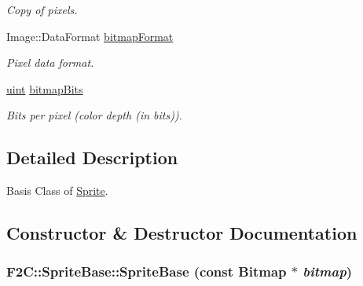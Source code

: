 \begin{DoxyCompactItemize}
\begin{DoxyCompactList}\small\item\em Copy of pixels. \item\end{DoxyCompactList}\item 
\hypertarget{class_f2_c_1_1_sprite_base_a3f77c0311c6528deddc24e09bd132011}{
Image::DataFormat \hyperlink{class_f2_c_1_1_sprite_base_a3f77c0311c6528deddc24e09bd132011}{bitmapFormat}}
\label{class_f2_c_1_1_sprite_base_a3f77c0311c6528deddc24e09bd132011}

\begin{DoxyCompactList}\small\item\em Pixel data format. \item\end{DoxyCompactList}\item 
\hypertarget{class_f2_c_1_1_sprite_base_aace539201a27ea859def56d690cc47f9}{
\hyperlink{namespace_f2_c_a58be2bac9eb3e3c99cb41b6008bf4fae}{uint} \hyperlink{class_f2_c_1_1_sprite_base_aace539201a27ea859def56d690cc47f9}{bitmapBits}}
\label{class_f2_c_1_1_sprite_base_aace539201a27ea859def56d690cc47f9}

\begin{DoxyCompactList}\small\item\em Bits per pixel (color depth (in bits)). \item\end{DoxyCompactList}\end{DoxyCompactItemize}


\subsection{Detailed Description}
Basis Class of \hyperlink{class_f2_c_1_1_sprite}{Sprite}. 

\subsection{Constructor \& Destructor Documentation}
\hypertarget{class_f2_c_1_1_sprite_base_aa00534841b3adc48e992e2282ec6963f}{
\subsubsection[{SpriteBase}]{\setlength{\rightskip}{0pt plus 5cm}F2C::SpriteBase::SpriteBase (const {\bf Bitmap} $\ast$ {\em bitmap})}}
\label{class_f2_c_1_1_sprite_base_aa00534841b3adc48e992e2282ec6963f}


